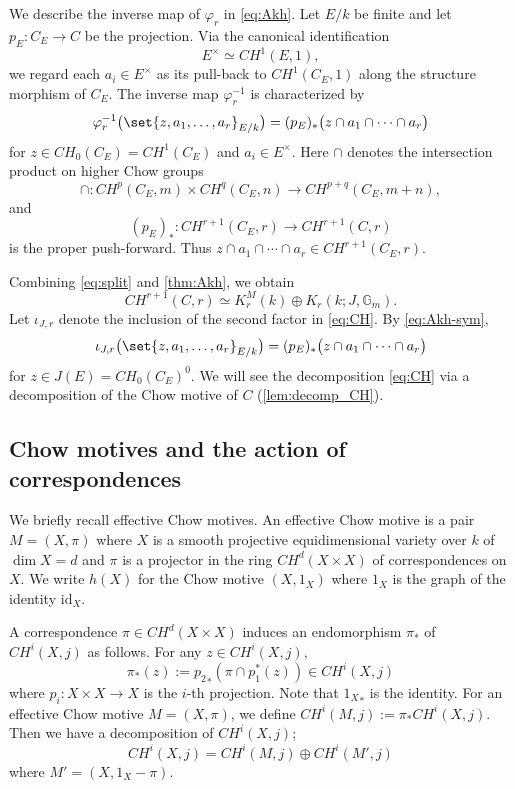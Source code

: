 \documentclass[a4paper,12pt]{amsart}
\numberwithin{equation}{section}
\theoremstyle{definition}
\newcommand{\Gm}{\mathbb{G}_{m}}
\begin{document}
We describe the inverse map of $\varphi_r$ in \eqref{eq:Akh}.
Let $E/k$ be finite and let $p_E\colon C_E\to C$ be the projection.
Via the canonical identification
\[
 E^\times\simeq CH^1(E,1),
\]
we regard each $a_i\in E^\times$ as its pull-back to
$CH^1(C_E,1)$ along the structure morphism of $C_E$.  The inverse map
$\varphi_r^{-1}$ is characterized by
\begin{equation}\label{eq:Akh-sym}
 \varphi_r^{-1}\bigl(\set{z,a_1,\ldots,a_r}_{E/k}\bigr)
 = (p_E)_*\bigl(z\cap a_1\cap\cdots\cap a_r\bigr)
\end{equation}
for $z\in CH_0(C_E)=CH^1(C_E)$ and $a_i\in E^\times$.  Here $\cap$
denotes the intersection product on higher Chow groups
\[
 \cap\colon CH^p(C_E,m)\times CH^q(C_E,n)
 \to CH^{p+q}(C_E,m+n),
\]
and
\[
 (p_E)_*\colon CH^{r+1}(C_E,r)\to CH^{r+1}(C,r)
\]
is the proper push-forward.  Thus
$z\cap a_1\cap\cdots\cap a_r\in CH^{r+1}(C_E,r)$.

Combining \eqref{eq:split} and \autoref{thm:Akh}, we obtain
\begin{equation}\label{eq:CH}
 CH^{r+1}(C,r)
 \simeq
 K_r^M(k)\oplus
 K_r(k;J,\Gm).
\end{equation}
Let $\iota_{J,r}$ denote the inclusion of the second factor in
\eqref{eq:CH}.  By \eqref{eq:Akh-sym},
\begin{equation}\label{eq:iota}
 \iota_{J,r}\bigl(\set{z,a_1,\ldots,a_r}_{E/k}\bigr)
 = (p_E)_*\bigl(z\cap a_1\cap\cdots\cap a_r\bigr)
\end{equation}
for $z\in J(E)=CH_0(C_E)^0$.
We will see the decomposition \eqref{eq:CH} via a decomposition of the Chow motive of $C$ (\autoref{lem:decomp_CH}).






\subsection{Chow motives and the action of correspondences}
We briefly recall effective Chow motives.
An effective Chow motive is a pair $M=(X,\pi)$ where $X$ is a smooth projective equidimensional variety over $k$ of $\dim X=d$ and $\pi$ is a projector in the ring $CH^{d}(X\times X)$ of correspondences on $X$.
We write $h(X)$ for the Chow motive $(X,1_X)$ where $1_X$ is the graph of the identity $\mathrm{id}_X$. 


A correspondence $\pi\in CH^d(X\times X)$ induces an endomorphism $\pi_\ast$ of $CH^i(X,j)$ as follows.
For any $z\in CH^i(X,j)$, 
$$
\pi_\ast(z):={p_2}_\ast(\pi \cap p_1^\ast(z))\in CH^i(X,j)
$$
where $p_i:X\times X\to X$ is the $i$-th projection.
Note that ${1_X}_\ast$ is the identity.
For an effective Chow motive $M=(X,\pi)$, we define 
$
CH^i(M,j):=\pi_\ast CH^i(X,j)$.
Then we have a decomposition of $CH^i(X,j)$;
$$
CH^i(X,j)=CH^i(M,j)\oplus CH^i(M',j)
$$
where $M'=(X,1_X-\pi)$.
\end{document}
